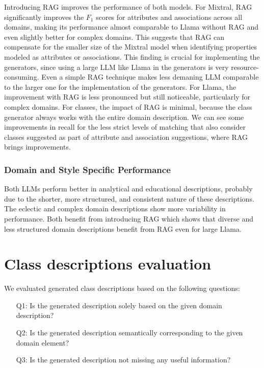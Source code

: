 Introducing RAG improves the performance of both models.
For Mixtral, RAG significantly improves the $F_1$ scores for attributes and associations across all domains, making its performance almost comparable to Llama without RAG and even slightly better for complex domains.
This suggests that RAG can compensate for the smaller size of the Mixtral model when identifying properties modeled as attributes or associations.
This finding is crucial for implementing the generators, since using a large LLM like Llama in the generators is very resource-consuming.
Even a simple RAG technique makes less demaning LLM comparable to the larger one for the implementation of the generators.
For Llama, the improvement with RAG is less pronounced but still noticeable, particularly for complex domains.
For classes, the impact of RAG is minimal, because the class generator always works with the entire domain description.
We can see some improvements in recall for the less strict levels of matching that also consider classes suggested as part of attribute and association suggestions, where RAG brings improvements.


\subsubsection{Domain and Style Specific Performance}

Both LLMs perform better in analytical and educational descriptions, probably due to the shorter, more structured, and consistent nature of these descriptions.
The eclectic and complex domain descriptions show more variability in performance.
Both benefit from introducing RAG which shows that diverse and less structured domain descriptions benefit from RAG even for large Llama.


\section{Class descriptions evaluation}

We evaluated generated class descriptions based on the following questions:

\begin{enumerate}
\item [Q1:] Is the generated description solely based on the given domain description?
\item [Q2:] Is the generated description semantically corresponding to the given domain element?
\item [Q3:] Is the generated description not missing any useful information?
\end{enumerate}


